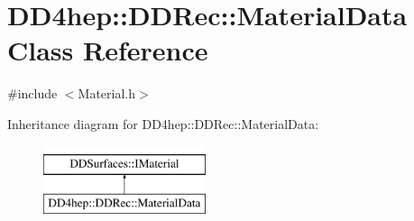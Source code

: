 \hypertarget{class_d_d4hep_1_1_d_d_rec_1_1_material_data}{}\section{D\+D4hep\+:\+:D\+D\+Rec\+:\+:Material\+Data Class Reference}
\label{class_d_d4hep_1_1_d_d_rec_1_1_material_data}


{\ttfamily \#include $<$Material.\+h$>$}

Inheritance diagram for D\+D4hep\+:\+:D\+D\+Rec\+:\+:Material\+Data\+:\begin{figure}[H]
\begin{center}
\leavevmode
\includegraphics[height=2.000000cm]{class_d_d4hep_1_1_d_d_rec_1_1_material_data}
\end{center}
\end{figure}
